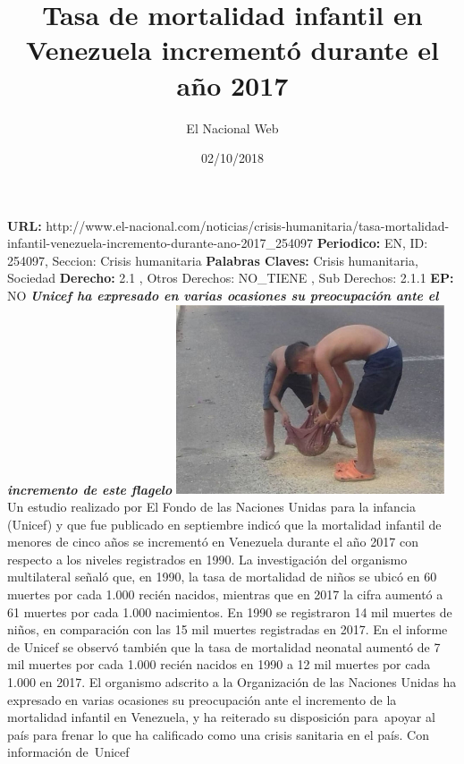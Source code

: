\documentclass{article}%
\title{\textbf{Tasa de mortalidad infantil en Venezuela incrementó durante el año 2017}}%
\author{El Nacional Web}%
\date{02/10/2018}%
\begin{document}
%
\normalsize%
\maketitle%
\textbf{URL: }%
http://www.el{-}nacional.com/noticias/crisis{-}humanitaria/tasa{-}mortalidad{-}infantil{-}venezuela{-}incremento{-}durante{-}ano{-}2017\_254097\newline%
%
\textbf{Periodico: }%
EN, %
ID: %
254097, %
Seccion: %
Crisis humanitaria\newline%
%
\textbf{Palabras Claves: }%
Crisis humanitaria, Sociedad\newline%
%
\textbf{Derecho: }%
2.1%
, Otros Derechos: %
NO\_TIENE%
, Sub Derechos: %
2.1.1%
\newline%
%
\textbf{EP: }%
NO\newline%
\newline%
%
\textbf{\textit{Unicef ha expresado en varias ocasiones su preocupación ante el incremento de este flagelo}}%
\newline%
\newline%
%
\includegraphics[width=300px]{30.jpg}%
\newline%
%
Un estudio realizado por El Fondo de las Naciones Unidas para la infancia (Unicef) y que fue publicado en septiembre indicó que la mortalidad infantil de menores de cinco años se incrementó en Venezuela durante el año 2017 con respecto a los niveles registrados en 1990.%
\newline%
%
La investigación del organismo multilateral señaló que, en 1990, la tasa de mortalidad de niños se ubicó en 60 muertes por cada 1.000 recién nacidos, mientras que en 2017 la cifra aumentó a 61 muertes por cada 1.000 nacimientos.%
\newline%
%
En 1990 se registraron 14 mil muertes de niños, en comparación con las 15 mil muertes registradas en 2017.%
\newline%
%
En el informe de Unicef se observó también que la tasa de mortalidad neonatal aumentó de 7 mil muertes por cada 1.000 recién nacidos en 1990 a 12 mil muertes por cada 1.000 en 2017.%
\newline%
%
El organismo adscrito a la Organización de las Naciones Unidas ha expresado en varias ocasiones su preocupación ante el incremento de la mortalidad infantil en Venezuela, y ha reiterado su disposición para~apoyar al país para frenar lo que ha calificado como una crisis sanitaria en el país.%
\newline%
%
Con información de~Unicef%
\newline%
%
\end{document}
